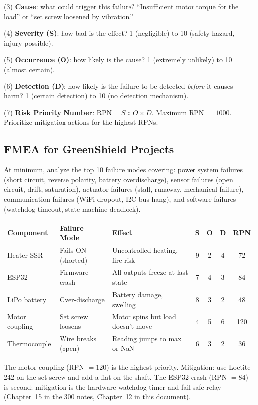 \documentclass[11pt,letterpaper,twoside,openany]{book}
\begin{document}
(3) \textbf{Cause}: what could trigger this failure? ``Insufficient motor torque for the load'' or ``set screw loosened by vibration.''

(4) \textbf{Severity (S)}: how bad is the effect? 1 (negligible) to 10 (safety hazard, injury possible).

(5) \textbf{Occurrence (O)}: how likely is the cause? 1 (extremely unlikely) to 10 (almost certain).

(6) \textbf{Detection (D)}: how likely is the failure to be detected \emph{before} it causes harm? 1 (certain detection) to 10 (no detection mechanism).

(7) \textbf{Risk Priority Number}: $\text{RPN} = S \times O \times D$. Maximum RPN $= 1000$. Prioritize mitigation actions for the highest RPNs.

\subsection{FMEA for GreenShield Projects}
At minimum, analyze the top 10 failure modes covering: power system failures (short circuit, reverse polarity, battery overdischarge), sensor failures (open circuit, drift, saturation), actuator failures (stall, runaway, mechanical failure), communication failures (WiFi dropout, I2C bus hang), and software failures (watchdog timeout, state machine deadlock).

\begin{greenshieldbox}
\begin{tabularx}{\textwidth}{p{2cm} p{2cm} p{2cm} c c c c}
\toprule
\textbf{Component} & \textbf{Failure Mode} & \textbf{Effect} & \textbf{S} & \textbf{O} & \textbf{D} & \textbf{RPN} \\
\midrule
Heater SSR & Fails ON (shorted) & Uncontrolled heating, fire risk & 9 & 2 & 4 & 72 \\
ESP32 & Firmware crash & All outputs freeze at last state & 7 & 4 & 3 & 84 \\
LiPo battery & Over-discharge & Battery damage, swelling & 8 & 3 & 2 & 48 \\
Motor coupling & Set screw loosens & Motor spins but load doesn't move & 4 & 5 & 6 & 120 \\
Thermocouple & Wire breaks (open) & Reading jumps to max or NaN & 6 & 3 & 2 & 36 \\
\bottomrule
\end{tabularx}
\vspace{0.3em}
The motor coupling (RPN $= 120$) is the highest priority. Mitigation: use Loctite 242 on the set screw and add a flat on the shaft. The ESP32 crash (RPN $= 84$) is second: mitigation is the hardware watchdog timer and fail-safe relay (Chapter~15 in the 300 notes, Chapter~12 in this document).
\end{greenshieldbox}
\end{document}
